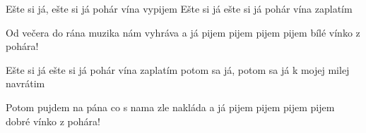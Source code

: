 
\ve{}
Ešte si já, ešte si já
pohár vína vypijem
Ešte si já ešte si já
pohár vína zaplatím

\cho{}
Od večera do rána
muzika nám vyhráva
a já pijem pijem pijem pijem
bílé vínko z pohára!

\ve{}
Ešte si já ešte si já
pohár vína zaplatím
potom sa já, potom sa já
k mojej milej navrátim

\cho{}
Potom pujdem na pána
co s nama zle nakláda
a já pijem pijem pijem pijem
dobré vínko z pohára!


\esong